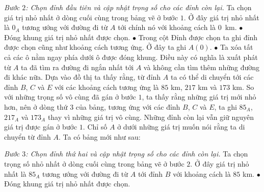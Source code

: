 \begin{multicols}{2}
\begin{table}[H]
		\vspace*{-10pt}
	\end{table}
	\textit{Bước $2$: Chọn đỉnh đầu tiên và cập nhật trọng số cho các đỉnh còn lại.}   
	Ta chọn giá trị nhỏ nhất ở dòng cuối cùng trong bảng vẽ ở bước $1$. Ở đây giá trị nhỏ nhất là $0_A$ tương ướng với đường đi từ $A$ tới chính nó với khoảng cách là $0$~km.
	\vskip 0.1cm
	$\bullet$ Đóng khung giá trị nhỏ nhất được chọn. 
	\vskip 0.1cm
	$\bullet$ Trong cột Đỉnh được chọn ta ghi đỉnh được chọn cũng như khoảng cách tương ứng. Ở đây ta ghi $A(0)$.
	\vskip 0.1cm
	$\bullet$ Ta xóa tất cả các ô nằm ngay phía dưới ô được đóng khung. Điều này có nghĩa là xuất phát từ $A$ ta đã tìm ra đường đi ngắn nhất tới $A$ và không cần tìm thêm những đường đi khác nữa.
	\vskip 0.1cm 
	Dựa vào đồ thị ta thấy rằng, từ đỉnh $A$ ta có thể di chuyển tới các đỉnh $B$, $C$ và $E$ với các khoảng cách tương ứng là $85$ km, $217$ km và $173$ km. So với những trọng số vô cùng đã gán ở bước $1$, ta thấy rằng những giá trị mới nhỏ hơn, nên ở dòng thứ $3$ của bảng, tương ứng với các đỉnh $B$, $C$ và $E$, ta ghi $85_A$, $217_A$ và $173_A$ thay vì những giá trị vô cùng. Những đỉnh còn lại vẫn giữ nguyên giá trị được gán ở bước $1$. Chỉ số $A$ ở dưới những giá trị muốn nói rằng ta di chuyển từ đỉnh $A$.
	\vskip 0.1cm 
	Ta có bảng mới như sau: 
	\begin{table}[H]
		\vspace*{-5pt}
		\centering
		\captionsetup{labelformat= empty, justification=centering}
		\vspace*{-10pt}
	\end{table}
	\textit{Bước $3$: Chọn đỉnh thứ hai và cập nhật trọng số cho các đỉnh còn lại.}  Ta chọn trọng số nhỏ nhất ở dòng cuối cùng trong bảng vẽ ở bước $2$. Ở đây giá trị nhỏ nhất là $85_A$ tương ướng với đường đi từ $A$ tới đỉnh $B$ với khoảng cách là  $85$ km.
	\vskip 0.1cm
	$\bullet$ Đóng khung giá trị nhỏ nhất được chọn. 

\end{multicols}
